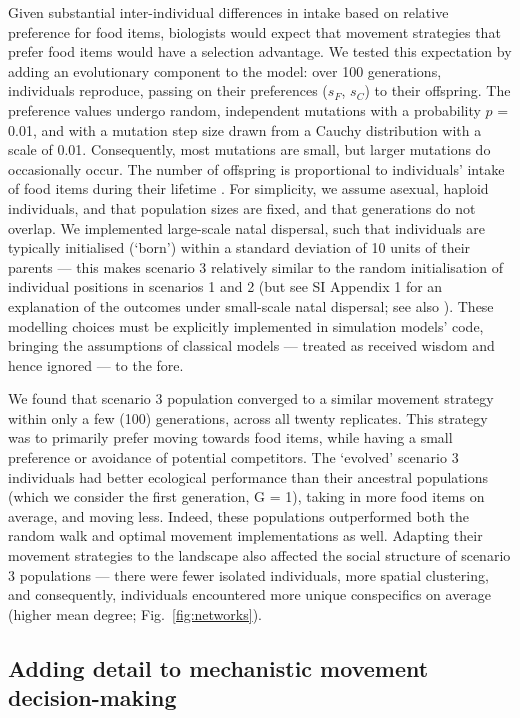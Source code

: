Given substantial inter-individual differences in intake based on relative preference for food items, biologists would expect that movement strategies that prefer food items would have a selection advantage.
We tested this expectation by adding an evolutionary component to the model: over 100 generations, individuals reproduce, passing on their preferences ($s_F$, $s_C$) to their offspring.
The preference values undergo random, independent mutations with a probability $p$ = 0.01, and with a mutation step size drawn from a Cauchy distribution with a scale of 0.01.
Consequently, most mutations are small, but larger mutations do occasionally occur.
The number of offspring is proportional to individuals' intake of food items during their lifetime \citep{netz2021,gupte2021a,gupte2022c}.
For simplicity, we assume asexual, haploid individuals, and that population sizes are fixed, and that generations do not overlap.
We implemented large-scale natal dispersal, such that individuals are typically initialised (`born') within a standard deviation of 10 units of their parents --- this makes scenario 3 relatively similar to the random initialisation of individual positions in scenarios 1 and 2 (but see SI Appendix 1 for an explanation of the outcomes under small-scale natal dispersal; see also \cite{gupte2021a,gupte2022c}).
These modelling choices must be explicitly implemented in simulation models' code, bringing the assumptions of classical models --- treated as received wisdom and hence ignored --- to the fore.

We found that scenario 3 population converged to a similar movement strategy within only a few (100) generations, across all twenty replicates.
This strategy was to primarily prefer moving towards food items, while having a small preference or avoidance of potential competitors.
The `evolved' scenario 3 individuals had better ecological performance than their ancestral populations (which we consider the first generation, G = 1), taking in more food items on average, and moving less.
Indeed, these populations outperformed both the random walk and optimal movement implementations as well.
Adapting their movement strategies to the landscape also affected the social structure of scenario 3 populations --- there were fewer isolated individuals, more spatial clustering, and consequently, individuals encountered more unique conspecifics on average (higher mean degree; Fig.~\ref{fig:networks}).

\subsection{Adding detail to mechanistic movement decision-making}

